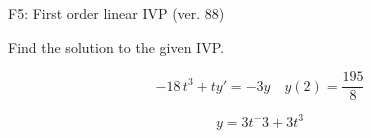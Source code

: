 \begin{exercise}
  \begin{exerciseTitle}F5: First order linear IVP (ver. 88)\end{exerciseTitle}
  \begin{exerciseStatement}
    
Find the solution to the given IVP.

    
\[-18 \, t^{3} +ty'= -3 y \hspace{1em} y( 2 ) = \frac{195}{8}\]

  \end{exerciseStatement}
  \begin{exerciseAnswer}
    
\[y= 3 t^ -3 +3 t^{3}\]

  \end{exerciseAnswer}
\end{exercise}